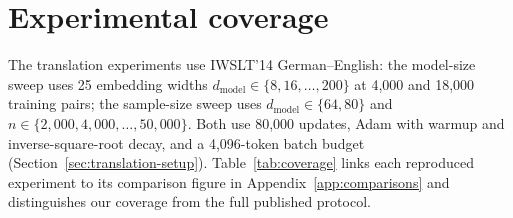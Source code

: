 \documentclass{article}
\begin{document}
\section{Experimental coverage}\label{app:coverage}
The translation experiments
use IWSLT'14 German--English: the model-size sweep uses 25 embedding
widths $d_{\mathrm{model}}\in\{8,16,\ldots,200\}$ at 4,000 and 18,000
training pairs; the sample-size sweep uses $d_{\mathrm{model}}\in\{64,80\}$
and $n\in\{2{,}000,\allowbreak4{,}000,\allowbreak\ldots,50{,}000\}$. Both use 80,000 updates,
Adam with warmup and inverse-square-root decay, and a 4,096-token batch
budget (Section~\ref{sec:translation-setup}). Table~\ref{tab:coverage}
links each reproduced experiment to its comparison figure in
Appendix~\ref{app:comparisons} and distinguishes our coverage from the
full published protocol.
\end{document}
